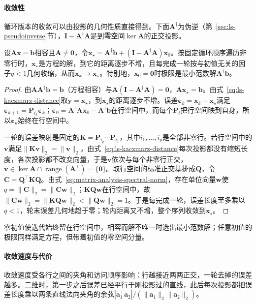 \paragraph{收敛性}
循环版本的收敛可以由投影的几何性质直接得到。下面$\bm A^\dagger$为伪逆（第~\ref{sec:ls-pseudoinverse}节），$\bm I-\bm A^\dagger\bm A$是到零空间$\ker\bm A$的正交投影。
\begin{theorem}[相容方程上循环Kaczmarz的收敛]
\label{thm:ls-kaczmarz-convergence}
设$\bm A\bm x=\bm b$相容且$\bm A\neq\bm 0$，令$\bm x_\star=\bm A^\dagger\bm b+(\bm I-\bm A^\dagger\bm A)\bm x_0$。按固定循环顺序遍历非零行时，$\bm x_\star$是方程的解，到它的距离逐步不增，且每完成一轮按与初值无关的因子$q<1$几何收缩，从而$\bm x_k\to\bm x_\star$。特别地，$\bm x_0=\bm 0$时极限是最小范数解$\bm A^\dagger\bm b$。
\end{theorem}
\begin{proof}
由$\bm A\bm A^\dagger\bm b=\bm b$（方程相容）与$\bm A(\bm I-\bm A^\dagger\bm A)=\bm0$，$\bm A\bm x_\star=\bm b$。由式~\eqref{eq:ls-kaczmarz-distance}取$\bm y=\bm x_\star$，到$\bm x_\star$的距离逐步不增。误差$\bm\varepsilon_k=\bm x_k-\bm x_\star$满足$\bm\varepsilon_{k+1}=\bm P_{i_k}\bm\varepsilon_k$；$\bm\varepsilon_0=\bm A^\dagger\bm A\bm x_0-\bm A^\dagger\bm b$在行空间中，而每个$\bm P_i$把行空间映到自身，所以$\bm\varepsilon_k$始终在行空间中。

一轮的误差映射是固定的$\bm K=\bm P_{i_p}\cdots\bm P_{i_1}$，其中$i_1,\ldots,i_p$是全部非零行。若行空间中的$\bm v$满足$\lVert\bm K\bm v\rVert_2=\lVert\bm v\rVert_2$，由式~\eqref{eq:ls-kaczmarz-distance}每次投影都没有缩短长度，各次投影都不改变向量，于是$\bm v$依次与每个非零行正交，$\bm v\in\ker\bm A\cap\operatorname{range}(\bm A^\top)=\{\bm 0\}$。取行空间的标准正交基排成$\bm Q$，令$\bm C=\bm Q^\top\bm K\bm Q$。由式~\eqref{eq:matrix-analysis-spectral-norm}，存在单位向量$\bm w$使$q=\lVert\bm C\rVert_2=\lVert\bm C\bm w\rVert_2$；$\bm K\bm Q\bm w$在行空间中，故$\lVert\bm C\bm w\rVert_2=\lVert\bm K\bm Q\bm w\rVert_2<\lVert\bm Q\bm w\rVert_2=1$。于是每完成一轮，误差长度至多乘以$q<1$，轮末误差几何地趋于零；轮内距离又不增，整个序列收敛到$\bm x_\star$。
\end{proof}
零初值使迭代始终留在行空间中，相容而解不唯一时选出最小范数解；任意初值的极限同样满足方程，但带着初值的零空间分量。

\paragraph{收敛速度与代价}
收敛速度受各行之间的夹角和访问顺序影响：行越接近两两正交，一轮去掉的误差越多。二维时，第一步之后误差已经平行于刚投影过的直线，此后每次投影都把误差长度乘以两条直线法向夹角的余弦$|\bm a_1^\top\bm a_2|/(\lVert\bm a_1\rVert_2\lVert\bm a_2\rVert_2)$。

